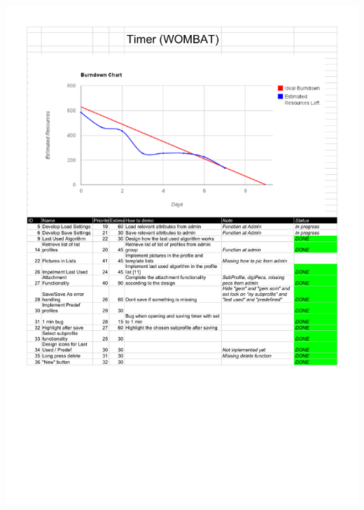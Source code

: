 \begin{center}
		\includegraphics[scale=0.5]{Development/burndown_charts/Sprint_3.pdf}

\end{center}
